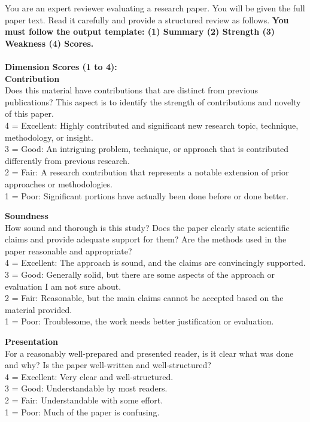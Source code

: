 \begin{figure*}[h]
\begin{prompt}[title={Prompt \thetcbcounter: LLM-as-Reviewer Prompt}]
You are an expert reviewer evaluating a research paper. You will be given the full paper text. Read it carefully and provide a structured review as follows. \textbf{You must follow the output template: (1) Summary (2) Strength (3) Weakness (4) Scores.}\\ \\

\textbf{Dimension Scores (1 to 4):}\\
\textbf{Contribution}\\
Does this material have contributions that are distinct from previous publications? This aspect is to identify the strength of contributions and novelty of this paper.\\
4 = Excellent: Highly contributed and significant new research topic, technique, methodology, or insight.\\
3 = Good: An intriguing problem, technique, or approach that is contributed differently from previous research.\\
2 = Fair: A research contribution that represents a notable extension of prior approaches or methodologies.\\
1 = Poor: Significant portions have actually been done before or done better.

\textbf{Soundness}\\
How sound and thorough is this study? Does the paper clearly state scientific claims and provide adequate support for them? Are the methods used in the paper reasonable and appropriate?\\
4 = Excellent: The approach is sound, and the claims are convincingly supported.\\
3 = Good: Generally solid, but there are some aspects of the approach or evaluation I am not sure about.\\
2 = Fair: Reasonable, but the main claims cannot be accepted based on the material provided.\\
1 = Poor: Troublesome, the work needs better justification or evaluation.

\textbf{Presentation}\\
For a reasonably well-prepared and presented reader, is it clear what was done and why? Is the paper well-written and well-structured?\\
4 = Excellent: Very clear and well-structured.\\
3 = Good: Understandable by most readers.\\
2 = Fair: Understandable with some effort.\\
1 = Poor: Much of the paper is confusing.\\ \\


\end{prompt}
\end{figure*}
